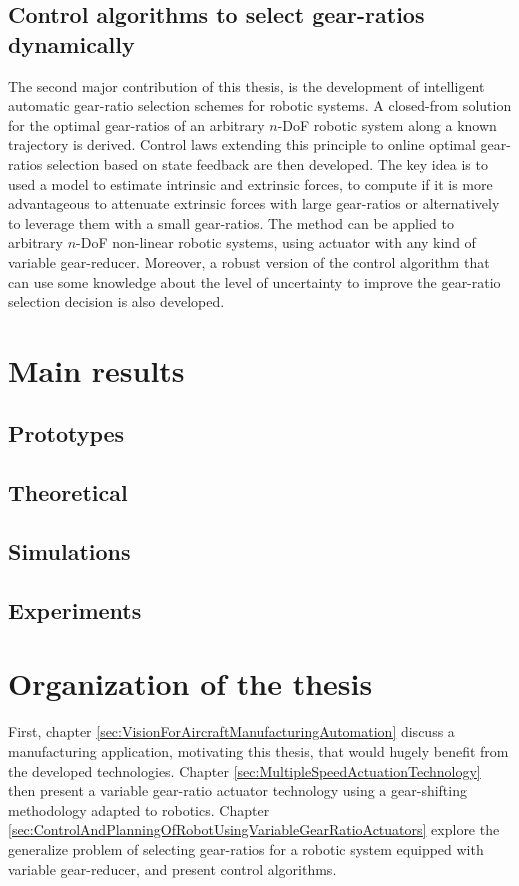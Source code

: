 \subsection{Control algorithms to select gear-ratios dynamically}

The second major contribution of this thesis, is the development of intelligent automatic gear-ratio selection schemes for robotic systems. A closed-from solution for the optimal gear-ratios of an arbitrary $n$-DoF robotic system along a known trajectory is derived. Control laws extending this principle to online optimal gear-ratios selection based on state feedback are then developed. The key idea is to used a model to estimate intrinsic and extrinsic forces, to compute if it is more advantageous to attenuate extrinsic forces with large gear-ratios or alternatively to leverage them with a small gear-ratios. The method can be applied to arbitrary $n$-DoF non-linear robotic systems, using actuator with any kind of variable gear-reducer. Moreover, a robust version of the control algorithm that can use some knowledge about the level of uncertainty to improve the gear-ratio selection decision is also developed.


\section{Main results}
\label{sec:mainresults}


\subsection{Prototypes}


\subsection{Theoretical}


\subsection{Simulations}


\subsection{Experiments}




\section{Organization of the thesis}
\label{sec:OrganisationOfTheThesis}

First, chapter \ref{sec:VisionForAircraftManufacturingAutomation} discuss a manufacturing application, motivating this thesis, that would hugely benefit from the developed technologies. Chapter \ref{sec:MultipleSpeedActuationTechnology} then present a variable gear-ratio actuator technology using a gear-shifting methodology adapted to robotics. Chapter \ref{sec:ControlAndPlanningOfRobotUsingVariableGearRatioActuators} explore the generalize problem of selecting gear-ratios for a robotic system equipped with variable gear-reducer, and present control algorithms. 


